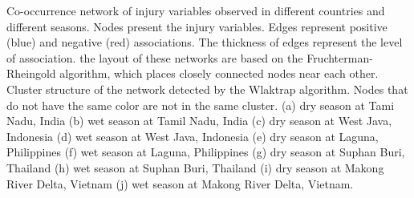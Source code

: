 Co-occurrence network of injury variables observed in different countries and different seasons. Nodes present the injury variables. Edges represent positive (blue) and negative (red) associations. The thickness of edges represent the level of association. the layout of these networks are based on the Fruchterman-Rheingold algorithm, which places closely connected nodes near each other. Cluster structure of the network detected by the Wlaktrap algorithm. Nodes that do not have the same color are not in the same cluster. (a) dry season at Tami Nadu, India (b)  wet season at Tamil Nadu, India (c) dry season at West Java, Indonesia (d) wet season at West Java, Indonesia (e) dry season at Laguna, Philippines (f) wet season at Laguna, Philippines (g) dry season at Suphan Buri, Thailand (h) wet season at Suphan Buri, Thailand (i) dry season at Makong River Delta, Vietnam (j) wet season at Makong River Delta, Vietnam.
